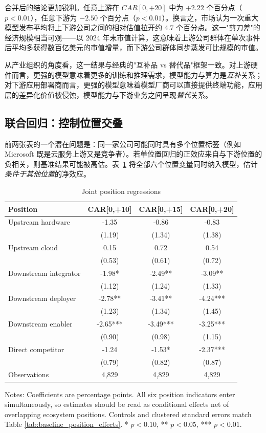 \documentclass[11pt,fontset=fandol,a4paper]{ctexart}
\begin{document}
合并后的结论更加锐利。任意上游在 $CAR[0,+20]$ 中为 $+2.22$ 个百分点（$p<0.01$），任意下游为 $-2.50$ 个百分点（$p<0.01$）。换言之，市场认为一次重大模型发布平均将上下游公司之间的相对估值拉开约 $4.7$ 个百分点。这一"剪刀差"的经济规模相当可观——以 2024 年末市值计算，这意味着上游公司群体在单次事件后平均多获得数百亿美元的市值增量，而下游公司群体同步蒸发可比规模的市值。

从产业组织的角度看，这一结果与经典的"互补品 vs 替代品"框架一致。对上游硬件而言，更强的模型意味着更多的训练和推理需求，模型能力与算力是\emph{互补}关系；对下游应用部署商而言，更强的模型意味着模型厂商可以直接提供终端功能，应用层的差异化价值被侵蚀，模型能力与下游业务之间呈现\emph{替代}关系。

\subsection{联合回归：控制位置交叠}\label{sec:joint}

前两张表的一个潜在问题是：同一家公司可能同时具有多个位置标签（例如 Microsoft 既是云服务上游又是竞争者）。若单位置回归的正效应来自与下游位置的负相关，则基准结果可能被高估。表~\ref{tab:joint_position_effects} 将全部六个位置变量同时纳入模型，估计\emph{条件于其他位置}的净效应。

\begin{table}[H]
\centering
\small
\caption{Joint position regressions}
\label{tab:joint_position_effects}
\begin{tabular}{lccc}
\toprule
Position & CAR[0,+10] & CAR[0,+15] & CAR[0,+20]\\
\midrule
Upstream hardware & -1.35 & -0.86 & -0.83\\
 & (1.19) & (1.34) & (1.38)\\
Upstream cloud & 0.15 & 0.72 & 0.54\\
 & (0.53) & (0.61) & (0.72)\\
Downstream integrator & -1.98* & -2.49** & -3.09**\\
 & (1.12) & (1.24) & (1.33)\\
Downstream deployer & -2.78** & -3.41** & -4.24***\\
 & (1.23) & (1.34) & (1.45)\\
Downstream enabler & -2.65*** & -3.49*** & -3.25***\\
 & (0.90) & (0.98) & (1.15)\\
Direct competitor & -1.24 & -1.53* & -2.37***\\
 & (0.79) & (0.82) & (0.87)\\
\midrule
Observations & 4{,}829 & 4{,}829 & 4{,}829\\
\bottomrule
\end{tabular}
\begin{minipage}{0.94\linewidth}
\vspace{0.4em}
\footnotesize
Notes: Coefficients are percentage points. All six position indicators enter simultaneously, so estimates should be read as conditional effects net of overlapping ecosystem positions. Controls and clustered standard errors match Table \ref{tab:baseline_position_effects}. * $p<0.10$, ** $p<0.05$, *** $p<0.01$.
\end{minipage}
\end{table}
\end{document}
